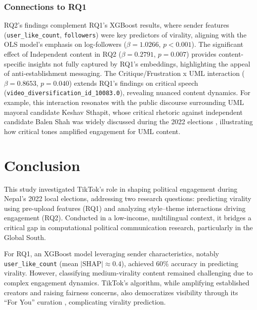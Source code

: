 \documentclass[12pt,a4paper]{report}
\begin{document}
\subsection*{Connections to RQ1}
RQ2’s findings complement RQ1’s XGBoost results, where sender features (\texttt{user\_like\_count}, \texttt{followers}) were key predictors of virality, aligning with the OLS model’s emphasis on log-followers (\(\beta = 1.0266\), \(p < 0.001\)). The significant effect of Independent content in RQ2 (\(\beta = 0.2791\), \(p = 0.007\)) provides content-specific insights not fully captured by RQ1’s embeddings, highlighting the appeal of anti-establishment messaging. The Critique/Frustration x UML interaction (\(\beta = 0.8653\), \(p = 0.040\)) extends RQ1’s findings on critical speech (\texttt{video\_diversification\_id\_10083.0}), revealing nuanced content dynamics. For example, this interaction resonates with the public discourse surrounding UML mayoral candidate Keshav Sthapit, whose critical rhetoric against independent candidate Balen Shah was widely discussed during the 2022 elections \parencite{setopati2025sthapit}, illustrating how critical tones amplified engagement for UML content.


\chapter{Conclusion}
This study investigated TikTok’s role in shaping political engagement during Nepal’s 2022 local elections, addressing two research questions: predicting virality using pre-upload features (RQ1) and analyzing style–theme interactions driving engagement (RQ2). Conducted in a low-income, multilingual context, it bridges a critical gap in computational political communication research, particularly in the Global South.

For RQ1, an XGBoost model leveraging sender characteristics, notably \texttt{user\_like\_count} (mean $\lvert$SHAP$\rvert \approx 0.4$), achieved 60\% accuracy in predicting virality. However, classifying medium-virality content remained challenging due to complex engagement dynamics. TikTok’s algorithm, while amplifying established creators and raising fairness concerns, also democratizes visibility through its ``For You'' curation \parencite{guinaudeau2022fifteen}, complicating virality prediction.
\end{document}
